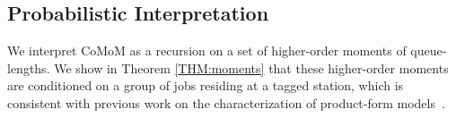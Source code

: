 \documentclass[journal,twocolumn,9.5pt]{IEEEtran}
\newtheorem{theorem}{Theorem}
\renewcommand{\Pr}{P}
\begin{document}
\subsection{Probabilistic Interpretation}
\label{SEC:probinterpret}
We interpret CoMoM as a recursion on a set of higher-order moments of queue-lengths. We show in Theorem \ref{THM:moments} that these higher-order moments are conditioned on a group of jobs residing at a tagged station, which is consistent with previous work on the characterization of product-form models~\cite{Zah84}.  %
\end{document}
